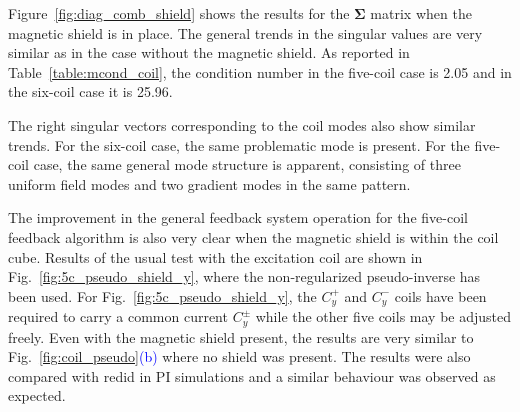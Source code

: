 Figure~\ref{fig:diag_comb_shield} shows the results for the
$\bm{\Sigma}$ matrix when the magnetic shield is in place.  The
general trends in the singular values are very similar as in the case
without the magnetic shield.  As reported in
Table~\ref{table:mcond_coil}, the condition number in the five-coil
case is 2.05 and in the six-coil case it is 25.96.


The right singular vectors corresponding to the coil modes also show
similar trends.  For the six-coil case, the same problematic mode is
present.  For the five-coil case, the same general mode structure is
apparent, consisting of three uniform field modes and two gradient
modes in the same pattern.


 


The improvement in the general feedback system operation for the
five-coil feedback algorithm is also very clear when the magnetic
shield is within the coil cube.  Results of the usual test with the
excitation coil are shown in Fig.~\ref{fig:5c_pseudo_shield_y}, where
the non-regularized pseudo-inverse has been used.  For
Fig.~\ref{fig:5c_pseudo_shield_y}, the $C_y^+$ and $C_y^-$ coils have
been required to carry a common current $C_y^\pm$ while the other five
coils may be adjusted freely.  Even with the magnetic shield present,
the results are very similar to Fig.~\ref{fig:coil_pseudo}\textcolor{blue}{(b)} where no
shield was present. The results were also compared with redid in PI simulations and a similar behaviour was observed as expected.



